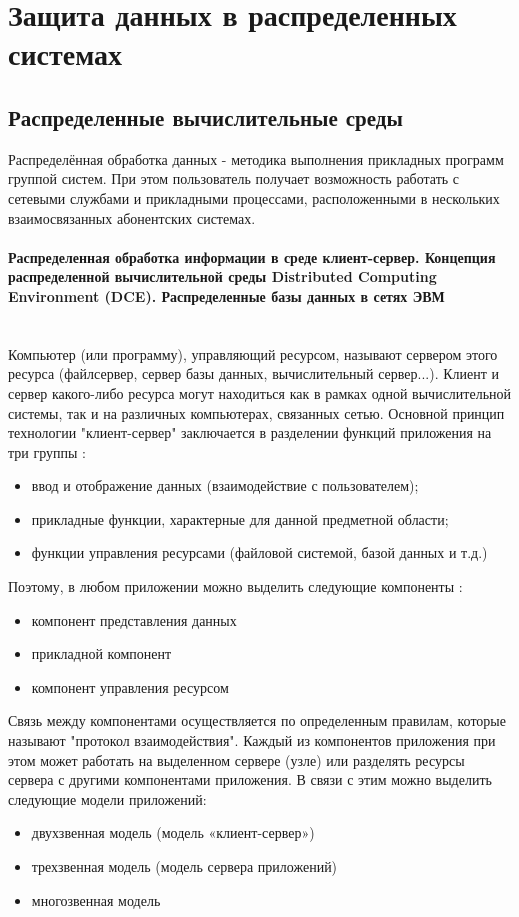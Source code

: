 \section{Защита данных в распределенных системах}
\subsection{Распределенные вычислительные среды}
Распределённая обработка данных - методика выполнения прикладных программ группой систем.
При этом пользователь получает возможность работать с сетевыми службами и прикладными процессами,
расположенными в нескольких взаимосвязанных абонентских системах. \autocite{Sergeeva}

\paragraph{
    Распределенная обработка информации в среде клиент-сервер.
    Концепция распределенной вычислительной среды Distributed Computing Environment (DCE).
    Распределенные базы данных в сетях ЭВМ
} ~\\

Компьютер (или программу), управляющий ресурсом, называют сервером этого ресурса (файлсервер, сервер базы данных,
вычислительный сервер...). Клиент и сервер какого-либо ресурса могут находиться как в рамках одной вычислительной системы,
так и на различных компьютерах, связанных сетью. Основной принцип технологии "клиент-сервер" заключается в разделении
функций приложения на три группы \autocite{4studClntSrv}:
\begin{itemize}
    \item ввод и отображение данных (взаимодействие с пользователем);
    \item прикладные функции, характерные для данной предметной области;
    \item функции управления ресурсами (файловой системой, базой данных и т.д.)
\end{itemize}

Поэтому, в любом приложении можно выделить следующие компоненты \autocite{4studClntSrv}:
\begin{itemize}
    \item компонент представления данных
    \item прикладной компонент
    \item компонент управления ресурсом
\end{itemize}

Связь между компонентами осуществляется по определенным правилам, которые называют "протокол взаимодействия".
Каждый из компонентов приложения при этом может работать на выделенном сервере (узле) или разделять ресурсы сервера
с другими компонентами приложения. В связи с этим можно выделить следующие модели приложений:
\begin{itemize}
    \item двухзвенная модель (модель «клиент-сервер»)
    \item трехзвенная модель (модель сервера приложений)
    \item многозвенная модель
\end{itemize}

